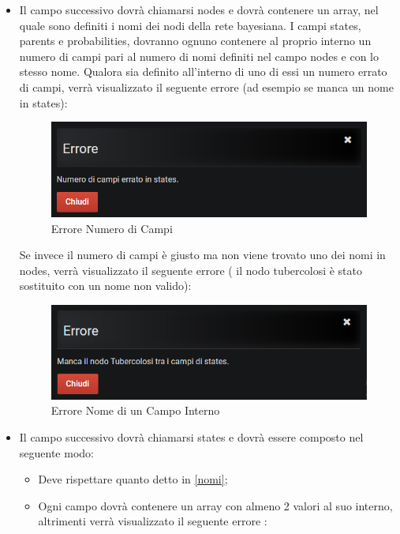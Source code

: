 \begin{itemize}
	\item Il campo successivo dovrà chiamarsi nodes e dovrà contenere un array, nel quale sono definiti i nomi dei nodi della rete bayesiana.\label{nomi} I campi states, parents e probabilities, dovranno ognuno contenere al proprio interno un numero di campi pari al numero di nomi definiti nel campo nodes e con lo stesso nome. Qualora sia definito all'interno di uno di essi un numero errato di campi, verrà visualizzato il seguente errore (ad esempio se manca un nome in states): 

\begin{figure}[H]
	\begin{center}
		\includegraphics[scale=0.8]{./images/numberFields.png}
		 \caption{Errore Numero di Campi}	
		 \label{erNumCampi}
	\end{center}
\end{figure}

Se invece il numero di campi è giusto ma non viene trovato uno dei nomi in nodes, verrà visualizzato il seguente errore ( il nodo tubercolosi è stato sostituito con un nome non valido):

\begin{figure}[H]
	\begin{center}
		\includegraphics[scale=0.8]{./images/wrongName.png}
		 \caption{Errore Nome di un Campo Interno}	
		 \label{erNumCampi}
	\end{center}
\end{figure}

	\item Il campo successivo dovrà chiamarsi states e dovrà essere composto nel seguente modo:
	\begin{itemize}
		\item Deve rispettare quanto detto  in \ref{nomi};
		\item Ogni campo dovrà contenere un array con almeno 2 valori al suo interno, altrimenti verrà visualizzato il seguente errore :
		

\end{itemize}
\end{itemize}
